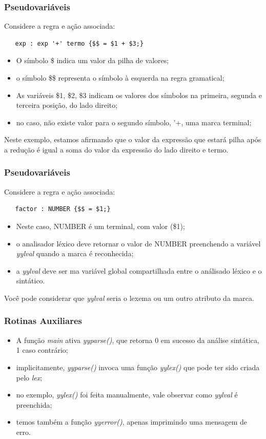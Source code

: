 \documentclass[table]{beamer}
\begin{document}
\begin{frame}[fragile]
   \frametitle{Pseudovariáveis}
   Considere a regra e ação associada:
   \begin{verbatim}
   exp : exp '+' termo {$$ = $1 + $3;}
   \end{verbatim}
   \begin{itemize}
      \item O símbolo \$ indica um valor da pilha de valores;
      \item o símbolo \$\$ representa o símbolo à esquerda na regra gramatical;
      \item As variáveis \$1, \$2, \$3 indicam os valores dos símbolos na primeira, segunda e terceira posição, do lado direito;
      \item no caso, não existe valor para o segundo símbolo, '+, uma marca terminal;
   \end{itemize}
   Neste exemplo, estamos afirmando que o valor da expressão que estará pilha após a redução é igual a soma do valor da expressão do lado direito e termo.
\end{frame}


\begin{frame}[fragile]
   \frametitle{Pseudovariáveis}
   Considere a regra e ação associada:
   \begin{verbatim}
   factor : NUMBER {$$ = $1;}
   \end{verbatim}
   \begin{itemize}
      \item Neste caso, NUMBER é um terminal, com valor (\$1);
      \item o analisador léxico deve retornar o valor de NUMBER preenchendo a variável \textit{yylval} quando a marca é reconhecida;
      \item a \textit{yylval} deve ser ma variável global compartilhada entre o análisado léxico e o sintático.
   \end{itemize}
   Você pode considerar que \textit{yylval} seria o lexema ou um outro atributo da marca.
\end{frame}

\begin{frame}
   \frametitle{Rotinas Auxiliares}
   \begin{itemize}
      \item A função \textit{main} ativa \textit{yyparse()}, que retorna 0 em sucesso da análise sintática, 1 caso contrário;
      \item implicitamente, \textit{yyparse()} invoca uma função \textit{yylex()} que pode ter sido criada pelo \textit{lex};
      \item no exemplo, \textit{yylex()} foi feita manualmente, vale observar como \textit{yylval} é preenchida;
      \item temos também a função \textit{yyerror()}, apenas imprimindo uma mensagem de erro.
   \end{itemize}
\end{frame}
\end{document}
